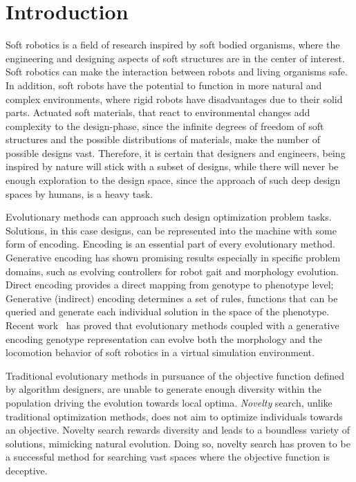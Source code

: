 
\chapter{Introduction} %
\label{Introduction} %


Soft robotics is a field of research inspired by soft bodied organisms, where the engineering and designing aspects of soft structures are in the center of interest. Soft robotics can make the interaction between robots and living organisms safe. In addition, soft robots have the potential to function in more natural and  complex environments, where rigid robots have disadvantages due to their solid parts. Actuated soft materials, that react to environmental changes add complexity to the design-phase, since the infinite degrees of freedom of soft structures and the possible distributions of materials, make the number of possible designs vast. Therefore, it is certain that designers and engineers, being inspired by nature will stick with a subset of designs, while there will never be enough exploration to the design space, since the approach of such deep design spaces by humans, is a heavy task.

Evolutionary methods can approach such design optimization problem tasks. Solutions, in this case designs, can be represented into the machine with some form of encoding. Encoding is an essential part of every evolutionary method. Generative encoding has shown promising results especially in specific problem domains, such as evolving controllers for robot gait and morphology evolution. Direct encoding provides a direct mapping from genotype to phenotype level; Generative (indirect) encoding determines a set of rules, functions that can be queried and generate each individual solution in the space of the phenotype. Recent work~\citep{cheney2013unshackling} has proved that evolutionary methods coupled with a generative encoding genotype representation can evolve both the morphology and the locomotion behavior of soft robotics in a virtual simulation environment.

Traditional evolutionary methods in pursuance of the objective function defined by algorithm designers, are unable to generate enough diversity within the population driving the evolution towards local optima. \emph{Novelty} search, unlike traditional optimization methods, does not aim to optimize individuals towards an objective. Novelty search rewards diversity and leads to a boundless variety of solutions, mimicking natural evolution. Doing so, novelty search has proven to be a successful method for searching vast spaces where the objective function is deceptive.

